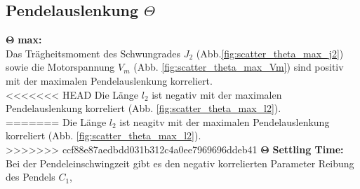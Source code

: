 \subsection*{Pendelauslenkung $\Theta$}
$\bm{\Theta}$ \textbf{max: }\\
Das Trägheitsmoment des Schwungrades $J_2$ (Abb.\ref{fig:scatter_theta_max_j2}) sowie die Motorspannung $V_m$ (Abb. \ref{fig:scatter_theta_max_Vm}) sind positiv mit der maximalen Pendelauslenkung korreliert.\\
<<<<<<< HEAD
Die Länge $l_2$ ist negativ mit der maximalen Pendelauslenkung korreliert (Abb. \ref{fig:scatter_theta_max_l2}).\\
=======
Die Länge $l_2$ ist neagitv mit der maximalen Pendelauslenkung korreliert (Abb. \ref{fig:scatter_theta_max_l2}).\\
>>>>>>> ccf88e87aedbdd031b312c4a0ee7969696ddeb41
$\bm{\Theta}$ \textbf{Settling Time: }\\
Bei der Pendeleinschwingzeit gibt es den negativ korrelierten Parameter \glqq Reibung des Pendels $C_1$\grqq{},
